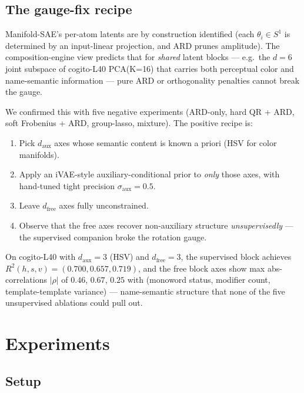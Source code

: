 \documentclass[10pt,twocolumn]{article}
\begin{document}
\subsection{The gauge-fix recipe}

Manifold-SAE's per-atom latents are by construction identified (each $\theta_i
\in S^1$ is determined by an input-linear projection, and ARD prunes amplitude).
The composition-engine view \cite{khemakhem2020ivae,wood2017gam,boumal2020manopt}
predicts that for \emph{shared} latent blocks --- e.g.\ the $d{=}6$ joint
subspace of cogito-L40 PCA(K{=}16) that carries both perceptual color and
name-semantic information --- pure ARD or orthogonality penalties cannot break
the gauge.

We confirmed this with five negative experiments (ARD-only, hard QR + ARD, soft
Frobenius + ARD, group-lasso, mixture). The positive recipe is:

\begin{enumerate}
\item Pick $d_{\text{aux}}$ axes whose semantic content is known a priori (HSV
for color manifolds).
\item Apply an iVAE-style auxiliary-conditional prior \cite{khemakhem2020ivae} to
\emph{only} those axes, with hand-tuned tight precision $\sigma_{\text{aux}}{=}0.5$.
\item Leave $d_{\text{free}}$ axes fully unconstrained.
\item Observe that the free axes recover non-auxiliary structure
\emph{unsupervisedly} --- the supervised companion broke the rotation gauge.
\end{enumerate}

On cogito-L40 with $d_{\text{aux}}{=}3$ (HSV) and $d_{\text{free}}{=}3$, the
supervised block achieves $R^2(h,s,v) = (0.700, 0.657, 0.719)$, and the free
block axes show max abs-correlations $|\rho|$ of $0.46$, $0.67$, $0.25$ with
(monoword status, modifier count, template-template variance) --- name-semantic
structure that none of the five unsupervised ablations could pull out.

\section{Experiments}
\label{sec:expts}

\subsection{Setup}
\end{document}

